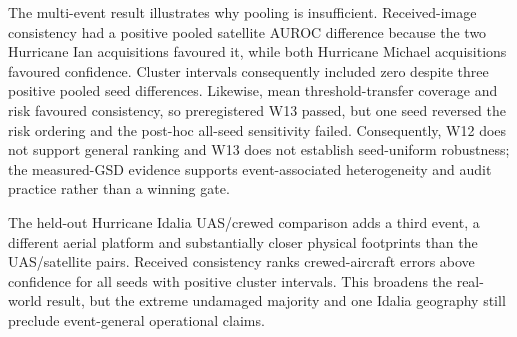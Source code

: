 The multi-event result illustrates why pooling is insufficient. Received-image
consistency had a positive pooled satellite AUROC difference because the two
Hurricane Ian acquisitions favoured it, while both Hurricane Michael
acquisitions favoured confidence. Cluster intervals consequently included zero despite three
positive pooled seed differences. Likewise, mean threshold-transfer coverage
and risk favoured consistency, so preregistered W13 passed, but one seed
reversed the risk ordering and the post-hoc all-seed sensitivity failed.
Consequently, W12 does not support general ranking and W13 does not establish
seed-uniform robustness; the measured-GSD evidence supports event-associated
heterogeneity and audit practice rather than a winning gate.

The held-out Hurricane Idalia UAS/crewed comparison adds a third event, a
different aerial platform and substantially closer physical footprints than the
UAS/satellite pairs. Received consistency ranks crewed-aircraft errors above
confidence for all seeds with positive cluster intervals. This broadens the
real-world result, but the extreme undamaged majority and one Idalia geography
still preclude event-general operational claims.

